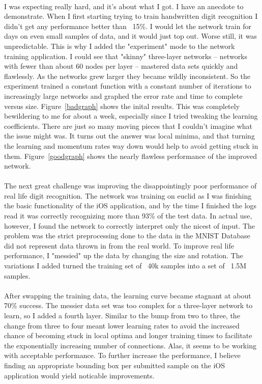 \documentclass{article}
\begin{document}
    \paragraph{}I was expecting really hard, and it's about what I got. I have an anecdote to
    demonstrate. When I first starting trying to train handwritten digit recognition I didn't
    get any performance better than ~15\%. I would let the network train for days on even small
    samples of data, and it would just top out. Worse still, it was unpredictable. This is
    why I added the "experiment" mode to the network training application. I could see that 
    "skinny" three-layer networks -- networks with fewer than about 60 nodes per layer -- mastered
    data sets quickly and flawlessly. As the networks grew larger they became wildly inconsistent.
    So the experiment trained a constant function with a constant number of iterations to
    increasingly large networks and graphed the error rate and time to complete versus size.
    Figure~\ref{badgraph} shows the inital results. This was completely bewildering to me for about
    a week, especially since I tried tweaking the learning coefficients. There are just so many
    moving pieces that I couldn't imagine what the issue might was. It turns out the answer was
    local minima, and that turning the learning and momentum rates way down would help to avoid
    getting stuck in them. Figure~\ref{goodgraph} shows the nearly flawless performance of
    the improved network.
    \paragraph{}The next great challenge was improving the disappointingly poor performance of
    real life digit recognition. The network was training on euclid as I was finishing the basic
    functionality of the iOS application, and by the time I finished the logs read it was
    correctly recognizing more than 93\% of the test data. In actual use, however, I found the
    network to correctly interpret only the nicest of input. The problem was the strict 
    preprocessing done to the data in the MNIST Database did not represent data thrown in from
    the real world. To improve real life performance, I "messied" up the data by changing the
    size and rotation. The variations I added turned the training set of ~40k samples into a
    set of ~1.5M samples. 
    \paragraph{}After swapping the training data, the learning curve became stagnant
    at about 70\% success. The messier data set was too complex for a three-layer network to learn,
    so I added a fourth layer. Similar to the bump from two to three, the change from three to
    four meant lower learning rates to avoid the increased chance of becoming stuck in local
    optima and longer training times to facilitate the exponentially increasing number of
    connections. Alas, it seems to be working with acceptable performance. To further increase
    the performance, I believe finding an appropriate bounding box per submitted sample on
    the iOS application would yield noticable improvements.
\end{document}
